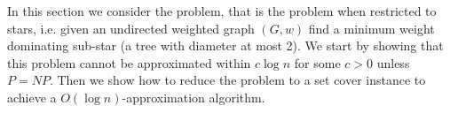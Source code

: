 In this section we consider the \ProblemStar{} problem, 
that is the \Problem{} problem when restricted to stars, i.e.
given an undirected weighted graph $(G, w)$ find a 
minimum weight dominating sub-star (a tree with diameter at most 2).
We start by showing that this problem cannot be approximated 
within $c\log n$ for some $c > 0$ unless $P = NP$.
Then we show how to reduce the problem to a set cover instance to achieve a 
$O(\log n)$-approximation algorithm.  